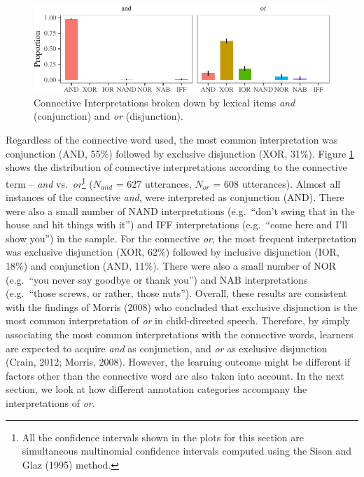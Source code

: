 \documentclass[
  english,
  ,man,floatsintext]{apa6}
\begin{document}
\begin{figure}[H]

{\centering \includegraphics{figs/interpretationPlot-1} 

}

\caption{Connective Interpretations broken down by lexical items \textit{and} (conjunction) and \textit{or} (disjunction).}\label{fig:interpretationPlot}
\end{figure}

Regardless of the connective word used, the most common interpretation was conjunction (AND, 55\%) followed by exclusive disjunction (XOR, 31\%). Figure \ref{fig:interpretationPlot} shows the distribution of connective interpretations according to the connective term -- \emph{and} vs.~\emph{or}\footnote{All the confidence intervals shown in the plots for this section are simultaneous multinomial confidence intervals computed using the Sison and Glaz (1995) method.} (\(N_{and}\) = 627 utterances, \(N_{or}\) = 608 utterances). Almost all instances of the connective \emph{and}, were interpreted as conjunction (AND). There were also a small number of NAND interpretations (e.g.~``don't swing that in the house and hit things with it'') and IFF interpretations (e.g.~``come here and I'll show you'') in the sample. For the connective \emph{or}, the most frequent interpretation was exclusive disjunction (XOR, 62\%) followed by inclusive disjunction (IOR, 18\%) and conjunction (AND, 11\%). There were also a small number of NOR (e.g.~``you never say goodbye or thank you'') and NAB interpretations (e.g.~``those screws, or rather, those nuts''). Overall, these results are consistent with the findings of Morris (2008) who concluded that exclusive disjunction is the most common interpretation of \emph{or} in child-directed speech. Therefore, by simply associating the most common interpretations with the connective words, learners are expected to acquire \emph{and} as conjunction, and \emph{or} as exclusive disjunction (Crain, 2012; Morris, 2008). However, the learning outcome might be different if factors other than the connective word are also taken into account. In the next section, we look at how different annotation categories accompany the interpretations of \emph{or}.
\end{document}
